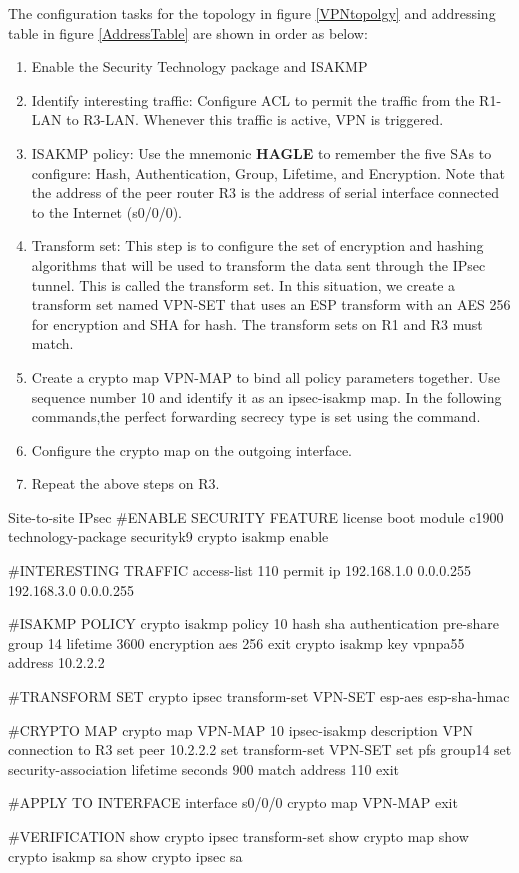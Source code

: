 The configuration tasks for the topology in figure \ref{VPNtopolgy} and addressing table in figure \ref{AddressTable} are shown in order as below:

\begin{enumerate}
\item Enable the Security Technology package and ISAKMP

\item Identify interesting traffic: Configure ACL to permit the traffic from the R1-LAN to R3-LAN. Whenever this traffic is active, VPN is triggered.

\item ISAKMP policy: Use the mnemonic \textbf{HAGLE} to remember the five SAs to configure: Hash, Authentication, Group, Lifetime, and Encryption. Note that the address of the peer router R3 is the address of serial interface connected to the Internet (s0/0/0).

\item Transform set: This step is to configure the set of encryption and hashing algorithms that will be used to transform the data sent through the IPsec tunnel. This is called the transform set. In this situation, we create a transform set named VPN-SET that uses an ESP transform with an AES 256 for encryption and SHA for hash. The transform sets on R1 and R3 must match. 

\item Create a crypto map VPN-MAP to bind all policy parameters together. Use sequence number 10 and identify it as an ipsec-isakmp map. In the following commands,the perfect forwarding secrecy type is set using the  command.

\item Configure the crypto map on the outgoing interface.

\item Repeat the above steps on R3.
\end{enumerate}

\begin{sexylisting}{Site-to-site IPsec}
#ENABLE SECURITY FEATURE
license boot module c1900 technology-package securityk9
crypto isakmp enable

#INTERESTING TRAFFIC
access-list 110 permit ip 192.168.1.0 0.0.0.255 192.168.3.0 0.0.0.255

#ISAKMP POLICY
crypto isakmp policy 10
	hash sha 
	authentication pre-share
	group 14
	lifetime 3600
	encryption aes 256
	exit
crypto isakmp key vpnpa55 address 10.2.2.2	

#TRANSFORM SET
crypto ipsec transform-set VPN-SET esp-aes esp-sha-hmac

#CRYPTO MAP
crypto map VPN-MAP 10 ipsec-isakmp
	description VPN connection to R3
	set peer 10.2.2.2
	set transform-set VPN-SET
	set pfs group14
	set security-association lifetime seconds 900 
	match address 110
	exit

#APPLY TO INTERFACE
interface s0/0/0
	crypto map VPN-MAP
	exit

#VERIFICATION
show crypto ipsec transform-set 
show crypto map
show crypto isakmp sa
show crypto ipsec sa		
\end{sexylisting}
